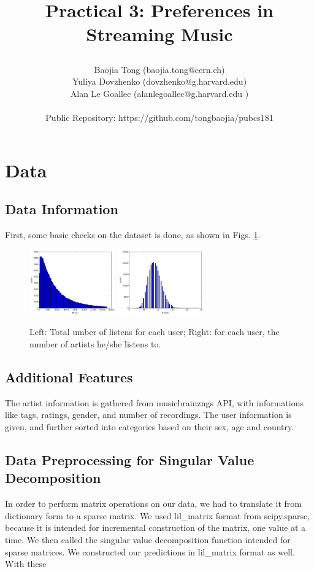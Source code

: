 \documentclass[11pt]{article}
\title{\begin{center}
{\Large Practical 3: Preferences in Streaming Music}
\end{center}}
\author{ Baojia Tong (baojia.tong@cern.ch)\\Yuliya Dovzhenko (dovzhenko@g.harvard.edu)\\Alan Le Goallec (alanlegoallec@g.harvard.edu )\\\\Public Repository: https://github.com/tongbaojia/pubcs181}
\begin{document}
\maketitle{}
\section{Data}
\subsection{Data Information}
First, some basic checks on the dataset is done, as shown in Figs. \ref{Info}.
\begin{figure}[] 
\centering
        \includegraphics[width=0.33\textwidth]{Plots/Nmusic_count_zoom.png}
        \includegraphics[width=0.33\textwidth]{Plots/Nartist_count.png}
        \caption{Left: Total umber of listens for each user; Right: for each user, the number of artists he/she listens to.}
            \label{Info}
\end{figure}
\subsection{Additional Features}
The artist information is gathered from musicbrainzngs API, with informations like tags, ratings, gender, and number of recordings. The user information is given, and further sorted into categories based on their sex, age and country.

\subsection{Data Preprocessing for Singular Value Decomposition}
In order to perform matrix operations on our data, we had to translate it from dictionary form to a sparse matrix. We used lil\_matrix format from scipy.sparse, because it is intended for incremental construction of the matrix, one value at a time. We then called the singular value decomposition function intended for sparse matrices. We constructed our predictions in lil\_matrix format as well. With these 
\end{document}
